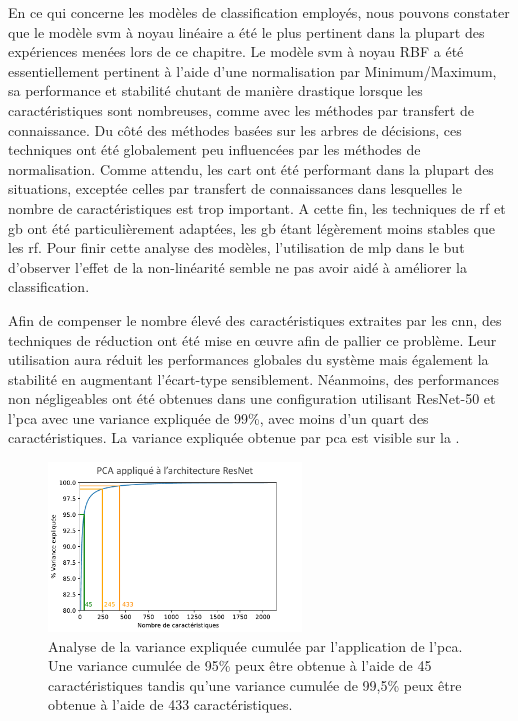 En ce qui concerne les modèles de classification employés, nous pouvons constater que le modèle \gls{svm} à noyau linéaire a été le plus pertinent dans la plupart des expériences menées lors de ce chapitre. Le modèle \gls{svm} à noyau RBF a été essentiellement pertinent à l'aide d'une normalisation par Minimum/Maximum, sa performance et stabilité chutant de manière drastique lorsque les caractéristiques sont nombreuses, comme avec les méthodes par transfert de connaissance. Du côté des méthodes basées sur les arbres de décisions, ces techniques ont été globalement peu influencées par les méthodes de normalisation. Comme attendu, les \gls{cart} ont été performant dans la plupart des situations, exceptée celles par transfert de connaissances dans lesquelles le nombre de caractéristiques est trop important. A cette fin, les techniques de \gls{rf} et \gls{gb} ont été particulièrement adaptées, les \gls{gb} étant légèrement moins stables que les \gls{rf}. Pour finir cette analyse des modèles, l'utilisation de \gls{mlp} dans le but d'observer l'effet de la non-linéarité semble ne pas avoir aidé à améliorer la classification.\par

Afin de compenser le nombre élevé des caractéristiques extraites par les \gls{cnn}, des techniques de réduction ont été mise en œuvre afin de pallier ce problème. Leur utilisation aura réduit les performances globales du système mais également la stabilité en augmentant l'écart-type sensiblement. Néanmoins, des performances non négligeables ont été obtenues dans une configuration utilisant ResNet-50 et l'\gls{pca} avec une variance expliquée de 99\%, avec moins d'un quart des caractéristiques. La variance expliquée obtenue par \gls{pca} est visible sur la .\par

\begin{figure}[H]
    \centering
    \includegraphics[width=0.6\textwidth]{contents/chapter_4/resources/results_image_classification_pca_variance.pdf}
    \caption{Analyse de la variance expliquée cumulée par l'application de l'\gls{pca}. Une variance cumulée de 95\% peux être obtenue à l'aide de 45 caractéristiques tandis qu'une variance cumulée de 99,5\% peux être obtenue à l'aide de 433 caractéristiques.}
    \label{fig:results_image_classification_pca_variance}
\end{figure}\par

